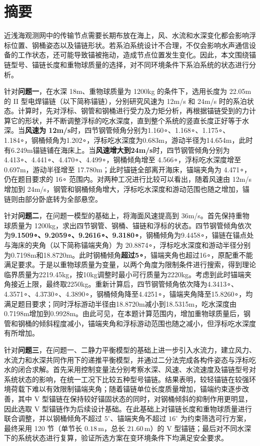 \begin{center}
  {\heiti{}\bfseries \PaperTitle}
\end{center}
\vspace{0.5em}

\section*{摘要}

近浅海观测网中的传输节点需要长期布放在海上，风、水流和水深变化都会影响浮标位置、钢桶姿态以及锚链形状。若系泊系统设计不合理，不仅会影响水声通信设备的工作状态，还可能导致锚被拖动，造成节点位置发生变化。因此，本文围绕锚链型号、锚链长度和重物球质量的选择，对不同环境条件下系泊系统的状态进行分析。

针对\textbf{问题一}，在水深 18m、重物球质量为 1200kg 的条件下，选用长度为 22.05m 的 II 型电焊锚链（以下简称锚链），分别研究风速为 12m/s 和 24m/s 时的系泊状态。计算时，先对浮标、钢管和钢桶进行受力及力矩分析，再根据锚链受到的力计算它的形状，并不断调整浮标的吃水深度，直到整个系统的竖直长度正好等于水深。当\textbf{风速为 12m/s}时，四节钢管倾角分别为1.160∘、1.168∘、1.175∘、1.184∘，钢桶倾角为1.202∘，浮标吃水深度为0.683m，游动半径为14.654m，此时有6.249m锚链铺在海床上。当\textbf{风速增大到24m/s}时，四节钢管倾角分别为4.413∘、4.441∘、4.470∘、4.499∘，钢桶倾角增至 4.566∘，浮标吃水深度增至 0.697m，游动半径增至 17.780m；此时锚链全部离开海床，锚端夹角为 4.471∘，仍在题目要求的 16∘ 范围内。对两种工况进行比较可以看出，随着风速由 12m/s 增加到 24m/s，钢管和钢桶倾角增大，浮标吃水深度和游动范围也随之增加，锚链则由部分卧底转为全部悬空。

针对\textbf{问题二}，在问题一模型的基础上，将海面风速提高到 36m/s。首先保持重物球质量为 1200kg，求出四节钢管、钢桶、锚链和浮标的状态。四节钢管倾角依次为\textbf{9.1509∘、9.2059∘、9.2616∘、9.3180∘}，钢桶倾角为9.4458∘，锚链在锚点处与海床的夹角（以下简称锚端夹角）为 20.8874∘，浮标吃水深度和游动半径分别为0.7198m和18.8720m。此时钢桶倾角\textbf{超过5∘}，锚端夹角也超过16∘，原配重不能满足要求。于是以重物球质量为变量，以两个角度为限制条件进行搜索，得到理论临界质量为2219.45kg，按10kg调整时最小可行质量为2220kg。考虑到此时锚端夹角接近上限，最终取2250kg。重新计算后，四节钢管倾角依次降为4.3413∘、4.3571∘、4.3730∘、4.3890∘，钢桶倾角降至4.4251∘，锚端夹角降至15.8260∘，均满足题目要求；同时浮标游动半径由18.8720m减小到18.5315m，吃水深度由0.7198m增加到0.9928m。由此可见，在本题计算范围内，增加重物球质量后，钢管和钢桶的倾斜程度减小，锚端夹角和浮标游动范围也随之减小，但浮标吃水深度有所增加。

针对\textbf{问题三}，在问题一、二静力平衡模型的基础上进一步引入水流力，建立风力、水流力和水深共同作用下的递推平衡模型，并通过二分法完成各构件姿态与浮标吃水的闭合求解。首先采用控制变量法分别考察水深、风速、水流速度及锚链型号对系统状态的影响，在统一工况下比较五种型号锚链。结果表明，较轻锚链在较强环境荷载下难以有效限制锚端夹角；随着锚链单位长度质量增加，锚端约束逐步改善，其中 V 型锚链在保持较好锚固状态的同时，对钢桶倾斜的抑制作用更明显，因此选取 V 型锚链作为后续设计基础。在此基础上对锚链长度和重物球质量进行联合调整，并以钢桶倾角不超过 \(5^\circ\)、锚端夹角不超过 \(16^\circ\) 为约束筛选可行方案，最终采用 120 节（单节长 \(0.18\,\mathrm m\)，总长 \(21.60\,\mathrm m\)）的 V 型锚链；最后对不同水深下的系统状态进行复算，验证所选方案在变环境条件下均满足安全要求。

